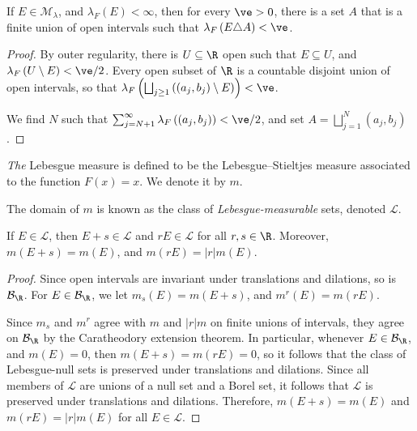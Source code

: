 \documentclass[10pt]{mypackage}
\begin{document}
\begin{proposition}
  If $E\in \mathcal{M}_{\lambda}$, and $\lambda_F\left( E  \right) < \infty$, then for every $\ve > 0$, there is a set $A$ that is a finite union of open intervals such that $\lambda_F\left( E\triangle A \right) < \ve$.
\end{proposition}
\begin{proof}
  By outer regularity, there is $U\subseteq \R$ open such that $E\subseteq U$, and $\lambda_F\left( U\setminus E \right) < \ve/2$. Every open subset of $\R$ is a countable disjoint union of open intervals, so that $\lambda_F \left( \bigsqcup_{j\geq 1}\left( \left( a_j,b_j \right)\setminus E \right) \right) < \ve$.\newline

  We find $N$ such that $\sum_{j=N+1}^{\infty}\lambda_F\left( \left( a_j,b_j \right) \right) < \ve/2$, and set $A = \bigsqcup_{j=1}^{N}\left( a_j,b_j \right)$.
\end{proof}
\begin{definition}
  \textit{The} Lebesgue measure is defined to be the Lebesgue--Stieltjes measure associated to the function $F(x) = x$. We denote it by $m$.\newline

  The domain of $m$ is known as the class of \textit{Lebesgue-measurable} sets, denoted $\mathcal{L}$.
\end{definition}
\begin{theorem}
  If $E\in \mathcal{L}$, then $E + s\in \mathcal{L}$ and $rE\in \mathcal{L}$ for all $r,s\in \R$. Moreover, $m\left( E + s \right)= m\left( E \right)$, and $m\left( rE \right) = \left\vert r \right\vert m(E)$.
\end{theorem}
\begin{proof}
  Since open intervals are invariant under translations and dilations, so is $\mathcal{B}_{\R}$. For $E\in \mathcal{B}_{\R}$, we let $m_s\left( E \right) = m\left( E + s \right)$, and $m^{r}\left( E \right) = m\left( rE \right)$.\newline

  Since $m_{s}$ and $m^{r}$ agree with $m$ and $\left\vert r \right\vert m$ on finite unions of intervals, they agree on $\mathcal{B}_{\R}$ by the Caratheodory extension theorem. In particular, whenever $E\in \mathcal{B}_{\R}$, and $m\left( E \right) = 0$, then $m\left( E + s \right) = m\left( rE \right) = 0$, so it follows that the class of Lebesgue-null sets is preserved under translations and dilations. Since all members of $\mathcal{L}$ are unions of a null set and a Borel set, it follows that $\mathcal{L}$ is preserved under translations and dilations. Therefore, $m\left( E + s \right) = m\left( E \right)$ and $m\left( rE \right) = \left\vert r \right\vert m\left( E \right)$ for all $E\in \mathcal{L}$.
\end{proof}
\end{document}
